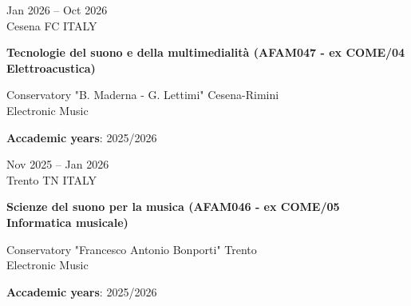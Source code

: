 \documentclass[7pt,a4paper]{article}
\begin{document}
\begin{mdframed}[
    backgroundcolor=entrygray,
    linecolor=entrygray,
    linewidth=0pt,
    innerleftmargin=6pt,
    innerrightmargin=6pt,
    innertopmargin=6pt,
    innerbottommargin=6pt,
    skipabove=0pt,
    skipbelow=0pt
]


\begin{minipage}[t]{0.28\textwidth}
\vspace{0pt}

Jan 2026 – Oct 2026
\\
\scriptsize Cesena FC ITALY

\end{minipage}
\begin{minipage}[t]{0.68\textwidth}
\vspace{0pt}

\textbf{\normalsize Tecnologie del suono e della multimedialità (AFAM047 - ex COME/04 Elettroacustica)}


\par Conservatory "B. Maderna - G. Lettimi" Cesena-Rimini 
\\\small Electronic Music





\scriptsize \textbf{Accademic years}: 2025/2026

\end{minipage}

\vspace{0.25cm}
\end{mdframed}


\begin{mdframed}[
    backgroundcolor=white,
    linecolor=white,
    linewidth=0pt,
    innerleftmargin=6pt,
    innerrightmargin=6pt,
    innertopmargin=6pt,
    innerbottommargin=6pt,
    skipabove=0pt,
    skipbelow=0pt
]


\begin{minipage}[t]{0.28\textwidth}
\vspace{0pt}

Nov 2025 – Jan 2026
\\
\scriptsize Trento TN ITALY

\end{minipage}
\begin{minipage}[t]{0.68\textwidth}
\vspace{0pt}

\textbf{\normalsize Scienze del suono per la musica (AFAM046 - ex COME/05 Informatica musicale)}


\par Conservatory "Francesco Antonio Bonporti" Trento 
\\\small Electronic Music





\scriptsize \textbf{Accademic years}: 2025/2026

\end{minipage}

\vspace{0.25cm}
\end{mdframed}
\end{document}
